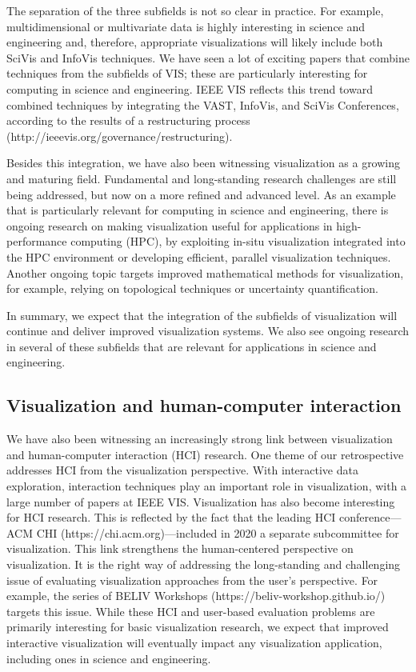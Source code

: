 \documentclass[10pt,journal,compsoc]{IEEEtran}
\begin{document}
The separation of the three subfields is not so clear in practice. For example, multidimensional or multivariate data is highly interesting in science and engineering and, therefore, appropriate visualizations will likely include both SciVis and InfoVis techniques. We have seen a lot of exciting papers that combine techniques from the subfields of VIS; these are particularly interesting for computing in science and engineering. 
IEEE VIS reflects this trend toward combined techniques by integrating the VAST, InfoVis, and SciVis Conferences, according to the results of a restructuring process (http://ieeevis.org/governance/restructuring).

Besides this integration, we have also been witnessing visualization as a growing and maturing field. Fundamental and long-standing research challenges are still being addressed, but now on a more refined and advanced level. As an example that is particularly relevant for computing in science and engineering, there is ongoing research on making visualization useful for applications in high-performance computing (HPC), by exploiting in-situ visualization integrated into the HPC environment or developing efficient, parallel visualization techniques. Another ongoing topic targets improved mathematical methods for visualization, for example, relying on topological techniques or uncertainty quantification. 

In summary, we expect that the integration of the subfields of visualization will continue and deliver improved visualization systems. We also see ongoing research in several of these subfields that are relevant for applications in science and engineering.


\subsection*{Visualization and human-computer interaction}

We have also been witnessing an increasingly strong link between visualization and human-computer interaction (HCI) research. One theme of our retrospective addresses HCI from the visualization perspective. With interactive data exploration, interaction techniques play an important role in visualization, with a large number of papers at IEEE VIS. Visualization has also become interesting for HCI research. This is reflected by the fact that the leading HCI conference---ACM CHI (https://chi.acm.org)---included in 2020 a separate subcommittee for visualization. This link strengthens the human-centered perspective on visualization.
It is the right way of addressing the long-standing and challenging issue of evaluating visualization approaches from the user's perspective. For example, the series of BELIV Workshops (https://beliv-workshop.github.io/) targets this issue. While these HCI and user-based evaluation problems are primarily interesting for basic visualization research, we expect that improved interactive visualization will eventually impact any visualization application, including ones in science and engineering.
\end{document}
